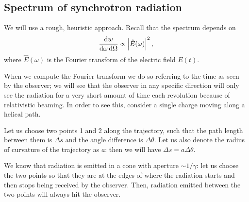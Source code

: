 \documentclass[main.tex]{subfiles}
\begin{document}
\subsection{Spectrum of synchrotron radiation}


We will use a rough, heuristic approach. 
Recall that the spectrum depends on 
%
\begin{align}
\frac{ \dd{w}}{ \dd{\omega } \dd{\Omega }} \propto \abs{\hat{E}(\omega )}^2
\,,
\end{align}
%
where \(\hat{E}(\omega )\) is the Fourier transform of the electric field \(E(t)\).

When we compute the Fourier transform we do so referring to the time as seen by the observer; we will see that the observer in any specific direction will only see the radiation for a very short amount of time each revolution because of relativistic beaming. 
In order to see this, consider a single charge moving along a helical path.  

Let us choose two points 1 and 2 along the trajectory, such that the path length between them is \(\Delta s\) and the angle difference is \(\Delta \theta \). Let us also denote the radius of curvature of the trajectory as \(a\): then we will have \(\Delta s = a \Delta \theta \). 

We know that radiation is emitted in a cone with aperture \(\sim 1/\gamma \): let us choose the two points so that they are at the edges of where the radiation starts and then stops being received by the observer.
Then, radiation emitted between the two points will always hit the observer.
\end{document}
